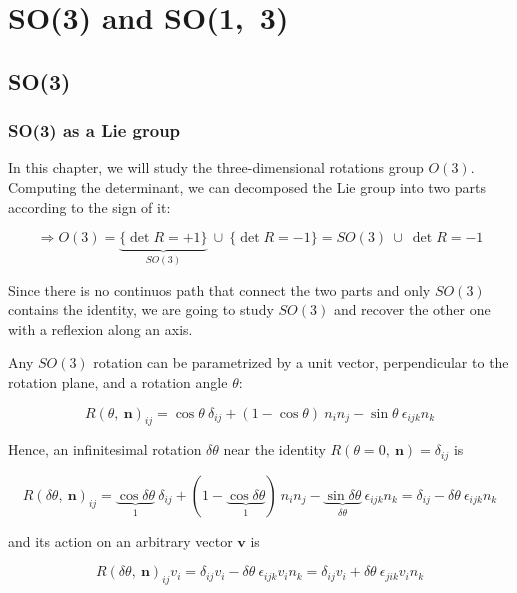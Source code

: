 \part{SO(3) and SO(1,~3)}

\chapter{SO(3)}

\section{SO(3) as a Lie group}

    In this chapter, we will study the three-dimensional rotations group $O(3)$. Computing the determinant, we can decomposed the Lie group into two parts according to the sign of it:

    \begin{equation*}
        \Rightarrow O(3) = \underbrace{\{\det R = +1\}}_{SO(3)} ~ \cup ~ \{\det R = -1\} = SO(3) ~ \cup ~ {\det R = -1}
    \end{equation*}

    Since there is no continuos path that connect the two parts and only $SO(3)$ contains the identity, we are going to study $SO(3)$ and recover the other one with a reflexion along an axis.

    Any $SO(3)$ rotation can be parametrized by a unit vector, perpendicular to the rotation plane, and a rotation angle $\theta$:\

    \begin{equation*}
        R(\theta, ~ \mathbf n)_{ij} = \cos \theta ~ \delta_{ij} + (1 - \cos \theta) ~ n_i n_j - \sin \theta ~ \epsilon_{ijk} n_k
    \end{equation*}

    Hence, an infinitesimal rotation $\delta \theta$ near the identity $R(\theta = 0, ~ \mathbf n) = \delta_{ij}$ is 

    \begin{equation*}
        R(\delta \theta, ~ \mathbf n)_{ij} = \underbrace{\cos \delta \theta }_{1} ~ \delta_{ij} + (1 - \underbrace{\cos \delta \theta }_{1}) ~ n_i n_j - \underbrace{\sin \delta \theta}_{\delta \theta} ~ \epsilon_{ijk} n_k = \delta_{ij} - \delta \theta ~ \epsilon_{ijk} n_k
    \end{equation*}

    and its action on an arbitrary vector $\mathbf v$ is 

    \begin{equation*}
        R(\delta \theta, ~ \mathbf n)_{ij} v_i = \delta_{ij} v_i - \delta \theta ~ \epsilon_{ijk} v_i n_k = \delta_{ij} v_i + \delta \theta ~ \epsilon_{jik} v_i n_k 
    \end{equation*}

